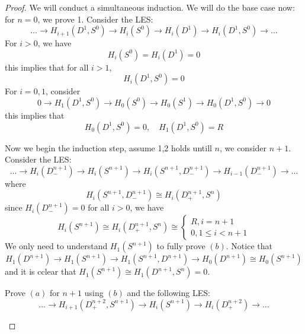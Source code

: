 \begin{proof}
    We will conduct a simultaneous induction. We will do the base case now: for $n=0$, we prove 1. Consider the LES:
    \begin{equation*}
        \dots\to H_{i+1}(D^1,S^0)\to H_i(S^0)\to H_i(D^1)\to H_i(D^1,S^0)\to\dots
    \end{equation*}
    For $i>0$, we have
    \begin{equation*}
        H_i(S^0)=H_i(D^1)=0
    \end{equation*}
    this implies that for all $i>1$,
    \begin{equation*}
        H_i(D^1,S^0)=0
    \end{equation*}
    For $i=0,1$, consider 
    \begin{equation*}
        0\to H_1(D^1,S^0)\to H_0(S^0)\to H_0(S^1)\to H_0(D^1,S^0)\to 0
    \end{equation*}
    this implies that 
    \begin{equation*}
        H_0(D^1,S^0)=0, \quad H_1(D^1,S^0)=R
    \end{equation*}

    Now we begin the induction step, assume 1,2 holds untill $n$, we consider $n+1$. Consider the LES:
    \begin{equation*}
        \dots\to H_i(D_-^{n+1})\to H_i(S^{n+1})\to H_i(S^{n+1},D_-^{n+1})\to H_{i-1}(D_-^{n+1})\to\dots
    \end{equation*}
    where 
    \begin{equation*}
        H_i(S^{n+1},D_-^{n+1})\cong H_i(D_+^{n+1}, S^n)
    \end{equation*}
    since $H_i(D_-^{n+1})=0$ for all $i>0$, we have 
    \begin{equation*}
        H_i(S^{n+1})\cong H_i(D_+^{n+1}, S^n)\cong\begin{cases}
            R, i=n+1\\
            0, 1\leq i<n+1
        \end{cases}
    \end{equation*}
    We only need to understand $H_1(S^{n+1})$ to fully prove $(b)$. Notice that 
    \begin{equation*}
        H_1(D^{n+1})\to H_1(S^{n+1})\to H_1(S^{n+1}, D^{n+1})\to H_0(D^{n+1})\cong H_0(S^{n+1})
    \end{equation*}
    and it is cclear that $H_1(S^{n+1})\cong H_1(D^{n+1}, S^n)=0$.
    \begin{prob}[HW(2.10)]
        Prove $(a)$ for $n+1$ using $(b)$ and the following LES:
        \begin{equation*}
            \dots\to H_{i+1}(D_+^{n+2}, S^{n+1})\to H_i(S^{n+1})\to H_i(D_+^{n+2})\to \dots
        \end{equation*}
    \end{prob}
\end{proof}
